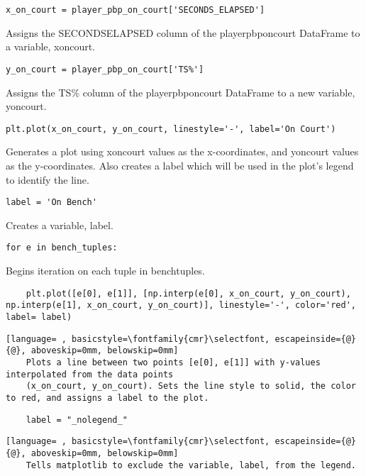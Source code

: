 \documentclass{article}
\begin{document}
\begin{lstlisting}
x_on_court = player_pbp_on_court['SECONDS_ELAPSED']
\end{lstlisting}
Assigns the SECONDS\textunderscore ELAPSED column of the player\textunderscore pbp\textunderscore on\textunderscore court DataFrame to a variable, x\textunderscore on\textunderscore court.
\begin{lstlisting}
y_on_court = player_pbp_on_court['TS%']
\end{lstlisting}
Assigns the TS\% column of the player\textunderscore pbp\textunderscore on\textunderscore court DataFrame to a new variable, y\textunderscore on\textunderscore court.
\begin{lstlisting}
plt.plot(x_on_court, y_on_court, linestyle='-', label='On Court')
\end{lstlisting}
Generates a plot using x\textunderscore on\textunderscore court values as the x-coordinates, and y\textunderscore on\textunderscore court values as the y-coordinates. Also creates a label which will be used in the plot's legend to identify the line.
\begin{lstlisting}
label = 'On Bench'
\end{lstlisting}
Creates a variable, label.
\begin{lstlisting}
for e in bench_tuples:
\end{lstlisting}
Begins iteration on each tuple in bench\textunderscore tuples.
\begin{lstlisting}
    plt.plot([e[0], e[1]], [np.interp(e[0], x_on_court, y_on_court), np.interp(e[1], x_on_court, y_on_court)], linestyle='-', color='red', label= label)
\end{lstlisting}
\begin{lstlisting}[language= , basicstyle=\fontfamily{cmr}\selectfont, escapeinside={@}{@}, aboveskip=0mm, belowskip=0mm]
    Plots a line between two points [e[0], e[1]] with y-values interpolated from the data points
    (x_on_court, y_on_court). Sets the line style to solid, the color to red, and assigns a label to the plot.
\end{lstlisting}
\begin{lstlisting}
    label = "_nolegend_"
\end{lstlisting}
\begin{lstlisting}[language= , basicstyle=\fontfamily{cmr}\selectfont, escapeinside={@}{@}, aboveskip=0mm, belowskip=0mm]
    Tells matplotlib to exclude the variable, label, from the legend.
\end{lstlisting}
\end{document}
